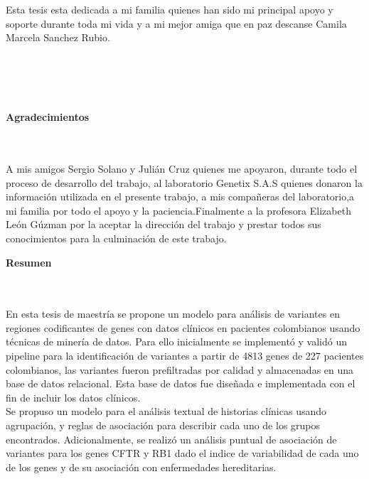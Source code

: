 \begin{flushright}
\begin{minipage}{8cm}
    \noindent
        Esta tesis esta dedicada a mi familia quienes han sido mi principal apoyo y soporte durante toda mi vida y a mi mejor amiga que en paz descanse Camila Marcela Sanchez Rubio.\\[1.0cm]\\
      \end{minipage}
\end{flushright}

\newpage{\pagestyle{empty}\cleardoublepage}

\newpage
\thispagestyle{empty} \textbf{}\normalsize
\\\\\\%
\textbf{\LARGE Agradecimientos}
\\\\
A mis amigos Sergio Solano y Julián Cruz quienes me apoyaron, durante todo el proceso de desarrollo del trabajo, al laboratorio Genetix S.A.S quienes donaron la información utilizada en el presente trabajo, a mis compañeras del laboratorio,a mi familia por todo el apoyo y la paciencia.Finalmente a la profesora Elizabeth León Gúzman por la aceptar la dirección del trabajo y prestar todos sus conocimientos para la culminación de este trabajo. \\

\newpage{\pagestyle{empty}\cleardoublepage}

\newpage
\textbf{\LARGE Resumen}
\\\\
En esta tesis de maestría se propone un modelo para análisis de variantes en regiones codificantes de genes con datos clínicos en pacientes colombianos usando técnicas de minería de datos. Para ello inicialmente se implementó y validó un  pipeline para la identificación de variantes a partir de 4813 genes de 227 pacientes colombianos, las variantes fueron prefiltradas por calidad y almacenadas en una base de datos relacional. Esta base de datos fue diseñada e implementada con el fin de incluir los datos clínicos. \\

Se propuso un modelo para el análisis textual de historias clínicas usando agrupación, y reglas de asociación para describir cada uno de los grupos encontrados. Adicionalmente, se realizó un análisis puntual de asociación de variantes para los genes CFTR y RB1 dado el indice de variabilidad de cada uno de los genes y de su asociación con enfermedades hereditarias. \\ 

